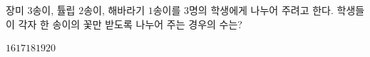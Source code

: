 장미 $3$송이, 튤립 $2$송이, 해바라기 $1$송이를 $3$명의 학생에게 나누어 주려고 한다. 학생들이 각자 한 송이의 꽃만 받도록 나누어 주는 경우의 수는? 
\begin{choices32}{$16$}{$17$}{$18$}{$19$}{$20$}\end{choices32}
